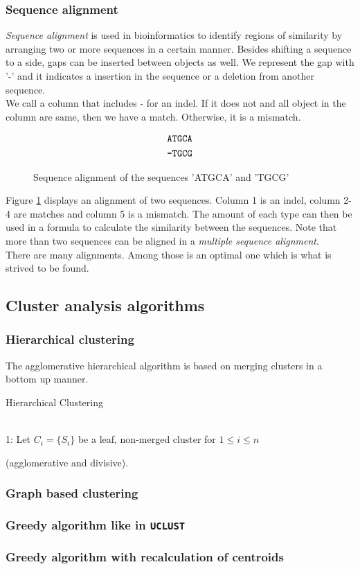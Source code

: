 \subsubsection{Sequence alignment}
\emph{Sequence alignment} is used in bioinformatics to identify regions of
similarity by arranging two or more sequences in a certain manner. Besides
shifting a sequence to a side, gaps can be inserted between objects as well. We
represent the gap with '-' and it indicates a insertion in the sequence or a
deletion from another sequence.\\
We call a column that includes - for an indel. If it does not and all object in
the column are same, then we have a match. Otherwise, it is a mismatch.\\
\begin{figure}[h!]
  \centering
  	  \begin{align*}
  	  	\mbox{\texttt{ATGCA}} \\
      	\mbox{\texttt{-TGCG}}
  	  \end{align*}
  \caption{Sequence alignment of the sequences 'ATGCA' and 'TGCG'}
  \label{fig:seqAlignment}
\end{figure}
Figure \ref{fig:seqAlignment} displays an alignment of two sequences. Column 1
is an indel, column 2-4 are matches and column 5 is a mismatch. The amount of
each type can then be used in a formula to calculate the similarity between the
sequences. Note that more than two sequences can be aligned in a \emph{multiple
sequence alignment}. \\
There are many alignments. Among those is an optimal one which is what is
strived to be found.

\subsection{Cluster analysis algorithms}

\subsubsection{Hierarchical clustering}
The agglomerative hierarchical algorithm is based on merging clusters in a bottom up manner.

\begin{algorithm}
\caption{Hierarchical Clustering}
\label{hierarchicalCluster}
\begin{algorithmic}
 \\
1: Let $C_i=\{S_i\}$ be a leaf, non-merged cluster for $1\leq i\leq n$
\EndFunction
\end{algorithmic}
\end{algorithm}


(agglomerative and divisive).

\subsubsection{Graph based clustering}


\subsubsection{Greedy algorithm like in \texttt{UCLUST}} 


\subsubsection{Greedy algorithm with recalculation of centroids}


